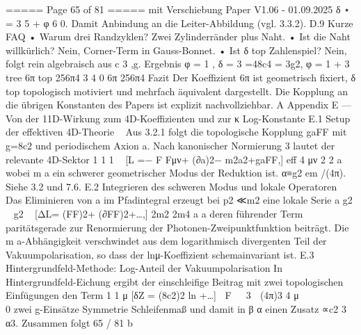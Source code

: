 \begin{MyVerbatim}
{{===== Page 65 of 81 =====
mit Verschiebung
Paper V1.06 - 01.09.2025
δ
⋆
= 3
5
+ φ
6
0.
Damit Anbindung an die Leiter-Abbildung (vgl. 3.3.2).
D.9 Kurze FAQ
• Warum drei Randzyklen? Zwei Zylinderränder plus Naht.
• Ist die Naht willkürlich? Nein, Corner-Term in Gauss-Bonnet.
• Ist δ top Zahlenspiel? Nein, folgt rein algebraisch aus c 3 ,g.
Ergebnis
φ = 1 , δ = 3 =48c4 = 3g2, φ = 1 + 3
tree 6π top 256π4 3 4 0 6π 256π4
Fazit
Der Koeffizient 6π ist geometrisch fixiert, δ top topologisch motiviert und mehrfach äquivalent dargestellt. Die Kopplung an
die übrigen Konstanten des Papers ist explizit nachvollziehbar.
A
Appendix E — Von der 11D-Wirkung zum 4D-Koeffizienten und zur
κ
Log-Konstante
E.1 Setup der effektiven 4D-Theorie
~
Aus 3.2.1 folgt die topologische Kopplung gaFF mit g=8c2 und periodischem Axion a. Nach kanonischer Normierung
3
lautet der relevante 4D-Sektor
1 1 1 ~
[L =− F Fμν+ (∂a)2− m2a2+gaFF,]
eff 4 μν 2 2 a
wobei m a ein schwerer geometrischer Modus der Reduktion ist. α≡g2 em /(4π). Siehe 3.2 und 7.6.
E.2 Integrieren des schweren Modus und lokale Operatoren
Das Eliminieren von a im Pfadintegral erzeugt bei p2 ≪m2 eine lokale Serie
a
g2 ~ g2 ~
[ΔL= (FF)2+ (∂FF)2+…,]
2m2 2m4
a a
deren führender Term paritätsgerade zur Renormierung der Photonen-Zweipunktfunktion beiträgt. Die m a-Abhängigkeit
verschwindet aus dem logarithmisch divergenten Teil der Vakuumpolarisation, so dass der lnμ-Koeffizient
schemainvariant ist.
E.3 Hintergrundfeld-Methode: Log-Anteil der Vakuumpolarisation
In Hintergrundfeld-Eichung ergibt der einschleifige Beitrag mit zwei topologischen Einfügungen den Term
1 1 μ
[δZ = (8c2)2 ln +…]
F  3  (4π)3 4 μ
      0
zwei g-Einsätze
Symmetrie
Schleifenmaß
und damit in β α einen Zusatz ∝c2 3 α3. Zusammen folgt
65 / 81
b

}}
\end{MyVerbatim}
